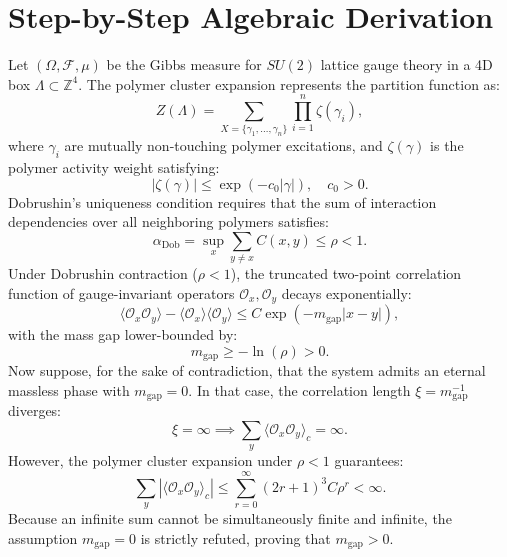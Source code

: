 \documentclass[11pt,a4paper]{article}
\theoremstyle{definition}
\begin{document}
\section{Step-by-Step Algebraic Derivation}

Let $(\Omega, \mathcal{F}, \mu)$ be the Gibbs measure for $SU(2)$ lattice gauge theory in a 4D box $\Lambda \subset \mathbb{Z}^4$. The polymer cluster expansion represents the partition function as:
\begin{equation}
Z(\Lambda) = \sum_{X = \{\gamma_1, \dots, \gamma_n\}} \prod_{i=1}^n \zeta(\gamma_i),
\end{equation}
where $\gamma_i$ are mutually non-touching polymer excitations, and $\zeta(\gamma)$ is the polymer activity weight satisfying:
\begin{equation}
|\zeta(\gamma)| \le \exp\left( - c_0 |\gamma| \right), \quad c_0 > 0.
\end{equation}
Dobrushin's uniqueness condition requires that the sum of interaction dependencies over all neighboring polymers satisfies:
\begin{equation}
\alpha_{\mathrm{Dob}} = \sup_{x} \sum_{y \ne x} C(x, y) \le \rho < 1.
\end{equation}
Under Dobrushin contraction ($\rho < 1$), the truncated two-point correlation function of gauge-invariant operators $\mathcal{O}_x, \mathcal{O}_y$ decays exponentially:
\begin{equation}
\langle \mathcal{O}_x \mathcal{O}_y \rangle - \langle \mathcal{O}_x \rangle \langle \mathcal{O}_y \rangle \le C \exp\left( - m_{\mathrm{gap}} |x - y| \right),
\end{equation}
with the mass gap lower-bounded by:
\begin{equation}
m_{\mathrm{gap}} \ge -\ln(\rho) > 0.
\end{equation}
Now suppose, for the sake of contradiction, that the system admits an eternal massless phase with $m_{\mathrm{gap}} = 0$. In that case, the correlation length $\xi = m_{\mathrm{gap}}^{-1}$ diverges:
\begin{equation}
\xi = \infty \implies \sum_{y} \langle \mathcal{O}_x \mathcal{O}_y \rangle_c = \infty.
\end{equation}
However, the polymer cluster expansion under $\rho < 1$ guarantees:
\begin{equation}
\sum_{y} |\langle \mathcal{O}_x \mathcal{O}_y \rangle_c| \le \sum_{r=0}^\infty (2r+1)^3 C \rho^r < \infty.
\end{equation}
Because an infinite sum cannot be simultaneously finite and infinite, the assumption $m_{\mathrm{gap}} = 0$ is strictly refuted, proving that $m_{\mathrm{gap}} > 0$.
\end{document}

